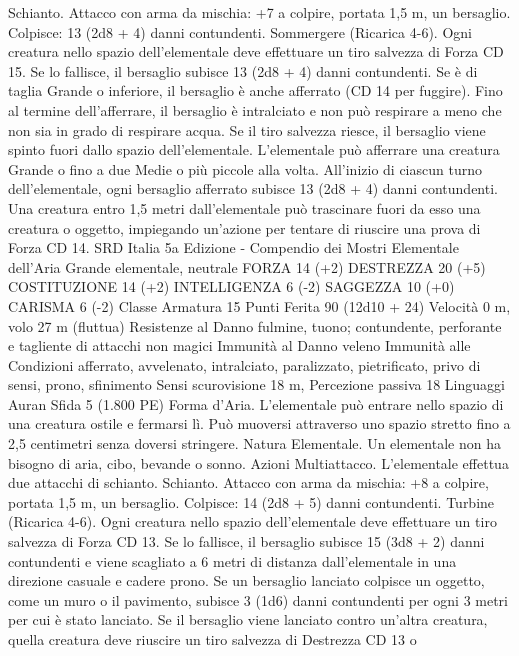 \begin{multicols}{2}
Schianto. Attacco con arma da mischia: +7 a colpire, portata 1,5
m, un bersaglio.
Colpisce: 13 (2d8 + 4) danni contundenti.
Sommergere (Ricarica 4-6). Ogni creatura nello spazio
dell’elementale deve effettuare un tiro salvezza di Forza CD 15.
Se lo fallisce, il bersaglio subisce 13 (2d8 + 4) danni
contundenti. Se è di taglia Grande o inferiore, il bersaglio è
anche afferrato (CD 14 per fuggire). Fino al termine
dell’afferrare, il bersaglio è intralciato e non può respirare a
meno che non sia in grado di respirare acqua. Se il tiro salvezza
riesce, il bersaglio viene spinto fuori dallo spazio
dell’elementale.
L’elementale può afferrare una creatura Grande o fino a due
Medie o più piccole alla volta. All’inizio di ciascun turno
dell’elementale, ogni bersaglio afferrato subisce 13 (2d8 + 4)
danni contundenti. Una creatura entro 1,5 metri dall’elementale
può trascinare fuori da esso una creatura o oggetto, impiegando
un’azione per tentare di riuscire una prova di Forza CD 14.
SRD Italia 5a Edizione - Compendio dei Mostri
Elementale dell’Aria
Grande elementale, neutrale
FORZA 14 (+2)
DESTREZZA 20 (+5)
COSTITUZIONE 14 (+2)
INTELLIGENZA 6 (-2)
SAGGEZZA 10 (+0)
CARISMA 6 (-2)
Classe Armatura 15
Punti Ferita 90 (12d10 + 24)
Velocità 0 m, volo 27 m (fluttua)
Resistenze al Danno fulmine, tuono; contundente, perforante e
tagliente di attacchi non magici
Immunità al Danno veleno
Immunità alle Condizioni afferrato, avvelenato, intralciato,
paralizzato, pietrificato, privo di sensi, prono, sfinimento
Sensi scurovisione 18 m, Percezione passiva 18
Linguaggi Auran
Sfida 5 (1.800 PE)
Forma d’Aria. L’elementale può entrare nello spazio di una
creatura ostile e fermarsi lì. Può muoversi attraverso uno spazio
stretto fino a 2,5 centimetri senza doversi stringere.
Natura Elementale. Un elementale non ha bisogno di aria, cibo,
bevande o sonno.
Azioni
Multiattacco. L’elementale effettua due attacchi di schianto.
Schianto. Attacco con arma da mischia: +8 a colpire, portata 1,5
m, un bersaglio.
Colpisce: 14 (2d8 + 5) danni contundenti.
Turbine (Ricarica 4-6). Ogni creatura nello spazio
dell’elementale deve effettuare un tiro salvezza di Forza CD 13.
Se lo fallisce, il bersaglio subisce 15 (3d8 + 2) danni contundenti
e viene scagliato a 6 metri di distanza dall’elementale in una
direzione casuale e cadere prono. Se un bersaglio lanciato
colpisce un oggetto, come un muro o il pavimento, subisce 3
(1d6) danni contundenti per ogni 3 metri per cui è stato lanciato.
Se il bersaglio viene lanciato contro un’altra creatura, quella
creatura deve riuscire un tiro salvezza di Destrezza CD 13 o

\end{multicols}
